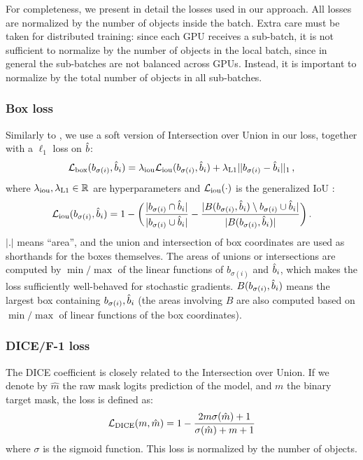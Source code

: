 For completeness, we present in detail the losses used in our approach. All  losses are normalized by the number of objects inside the batch. Extra care must be taken for distributed training: since each GPU receives a sub-batch, %
it is not sufficient to normalize by the number of objects in the local batch, 
since in general the sub-batches are not balanced across GPUs. 
Instead, it is important to normalize by the total number of objects in all sub-batches.

\subsubsection{Box loss}
 Similarly to \cite{RomeraParedes2015RecurrentIS,ren2017end}, we use a soft version of Intersection over Union in our loss,  together with a $\ell_1$ loss on $\hb$:
 \begin{equation}
     \bloss{b_{\sigma(i)}, \hb_i} = \lambda_{\rm iou}\iouloss{b_{\sigma(i)}, \hb_i} + \lambda_{\rm L1}||b_{\sigma(i)}- \hb_i||_1\,,
     \label{eq:bloss}
 \end{equation}
 where $\lambda_{\rm iou}, \lambda_{\rm L1}\in\Re$ are hyperparameters and $\iouloss{\cdot}$ is the generalized IoU \cite{Rezatofighi_2018_CVPR}:
 \begin{equation}
     \iouloss{b_{\sigma(i)}, \hb_i} = 1 - \bigg(\frac{ | b_{\sigma(i)}\cap \hb_i|}{|b_{\sigma(i)}\cup \hb_i|} - \frac{|B(b_{\sigma(i)},\hb_i)  \setminus b_{\sigma(i)} \cup \hb_i|}{|B(b_{\sigma(i)},\hb_i)|}\bigg)\,.
 \end{equation}
 $|.|$ means ``area'', and the union and intersection of box coordinates are used as shorthands for the boxes themselves. The areas of unions or intersections are computed by $\min/\max$ of the linear functions of $b_{\sigma(i)}$ and $\hb_i$, which makes the loss sufficiently well-behaved for stochastic gradients. $B(b_{\sigma(i)},\hb_i)$ means the largest box containing $b_{\sigma(i)},\hb_i$ (the areas involving $B$ are also computed based on $\min/\max$ of linear functions of the box coordinates).
 
\subsubsection{DICE/F-1 loss~\cite{milletari2016v}}
The DICE coefficient is closely related to the Intersection over Union. If we denote by $\hat{m}$ the raw mask logits prediction of the model, and $m$ the binary target mask, the loss is defined as:
\begin{equation}
\diceloss{m, \hat{m}} = 1 - \frac{2 m\sigma(\hat{m}) + 1}{\sigma(\hat{m}) + m + 1}
\end{equation}
where $\sigma$ is the sigmoid function. This loss is normalized by the number of objects.
